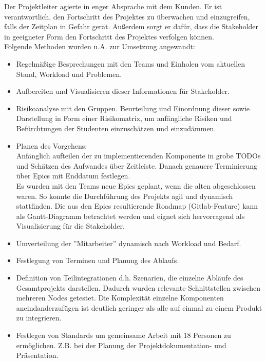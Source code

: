 Der Projektleiter agierte in enger Absprache mit dem Kunden. Er ist verantwortlich, den Fortschritt des Projektes zu überwachen und einzugreifen, falls der Zeitplan in Gefahr gerät. Außerdem sorgt er dafür, dass die Stakeholder in geeigneter Form den Fortschritt des Projektes verfolgen können. \\
Folgende Methoden wurden u.A. zur Umsetzung angewandt: \\
\begin{itemize}
    \item Regelmäßige Besprechungen mit den Teams und Einholen vom aktuellen Stand, Workload und Problemen.
    \item Aufbereiten und Visualisieren dieser Informationen für Stakeholder.
    \item Risikoanalyse mit den Gruppen. Beurteilung und Einordnung dieser sowie Darstellung in Form einer Risikomatrix, um anfängliche Risiken und Befürchtungen der Studenten einzuschätzen und einzudämmen.
    \item Planen des Vorgehens:\\
            Anfänglich aufteilen der zu implementierenden Komponente in grobe TODOs und Schätzen des Aufwandes über Zeitleiste. Danach genauere Terminierung über Epics mit Enddatum festlegen.\\ Es wurden mit den Teams neue Epics geplant, wenn die alten abgeschlossen waren. So konnte die Durchführung des Projekts agil und dynamisch stattfinden. Die aus den Epics resultierende Roadmap (Gitlab-Feature) kann als Gantt-Diagramm betrachtet werden und eignet sich hervorragend als Visualisierung für die Stakeholder.
    \item Umverteilung der ”Mitarbeiter” dynamisch nach Workload und Bedarf.
    \item Festlegung von Terminen und Planung des Ablaufs.
    \item Definition von Teilintegrationen d.h. Szenarien, die einzelne Abläufe des Gesamtprojekts darstellen. Dadurch wurden relevante Schnittstellen zwischen mehreren Nodes getestet. Die Komplexität einzelne Komponenten aneindanderzufügen ist deutlich geringer als alle auf einmal zu einem Produkt zu integrieren.  
    \item Festlegen von Standards um gemeinsame Arbeit mit 18 Personen zu ermöglichen. Z.B. bei der Planung der Projektdokumentation- und Präsentation.
\end{itemize}

